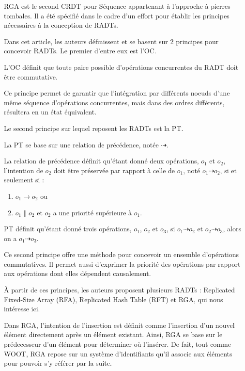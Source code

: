 \acf{RGA} \cite{ROH2011354} est le second \ac{CRDT} pour Séquence appartenant à l'approche à pierres tombales.
Il a été spécifié dans le cadre d'un effort pour établir les principes nécessaires à la conception de \acp{RADT}.

Dans cet article, les auteurs définissent et se basent sur 2 principes pour concevoir RADTs.
Le premier d'entre eux est l'\ac{OC}.
\begin{definition}[\acl{OC}]
  L'\acf{OC} définit que toute paire possible d'opérations concurrentes du \ac{RADT} doit être commutative.
\end{definition}
Ce principe permet de garantir que l'intégration par différents noeuds d'une même séquence d'opérations concurrentes, mais dans des ordres différents, résultera en un état équivalent.

Le second principe sur lequel reposent les RADTs est la \ac{PT}.
\begin{definition}[\acl{PT}]
  La \acf{PT} se base sur une relation de précédence, notée $\dashrightarrow$.
  \begin{subdefinition}
    La relation de précédence définit qu'étant donné deux opérations, $o_1$ et $o_2$, l'intention de $o_2$ doit être préservée par rapport à celle de $o_1$, noté $o_1 \dashrightarrow o_2$, si et seulement si :
    \begin{enumerate}[label=(\roman*)]
      \item $o_1 \rightarrow o_2$ ou
      \item $o_1 \parallel o_2$ et $o_2$ a une priorité supérieure à $o_1$.
    \end{enumerate}
  \end{subdefinition}
  \ac{PT} définit qu'étant donné trois opérations, $o_1$, $o_2$ et $o_3$, si $o_1 \dashrightarrow o_2$ et $o_2 \dashrightarrow o_3$, alors on a $o_1 \dashrightarrow o_3$.
\end{definition}
Ce second principe offre une méthode pour concevoir un ensemble d'opérations commutatives.
Il permet aussi d'exprimer la priorité des opérations par rapport aux opérations dont elles dépendent causalement.

À partir de ces principes, les auteurs proposent plusieurs \acp{RADT} : Replicated Fixed-Size Array (RFA), Replicated Hash Table (RFT) et \acf{RGA}, qui nous intéresse ici.

Dans \ac{RGA}, l'intention de l'insertion est définit comme l'insertion d'un nouvel élément directement après un élément existant.
Ainsi, \ac{RGA} se base sur le prédecesseur d'un élément pour déterminer où l'insérer.
De fait, tout comme WOOT, \ac{RGA} repose sur un système d'identifiants qu'il associe aux éléments pour pouvoir s'y référer par la suite.

